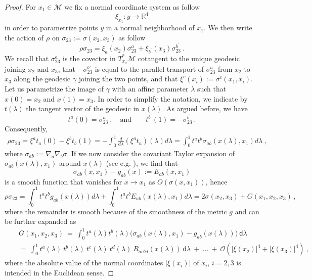 \documentclass[11pt]{book}
\newcommand{\abs}[1]{\left|#1\right|}
\newcommand{\Mcal}{\mathcal{M}}
\newcommand{\Ocal}{\mathcal{O}}
\newcommand{\Rbb}{\mathbb{R}}
\newcommand{\dsf}{\mathsf{d}}
\theoremstyle{break}
\begin{document}
\begin{proof}
For $x_1 \in \Mcal$ we fix a normal coordinate system as follow
%
\begin{equation*}
\xi_{x_1} : y \to \Rbb^4 
\end{equation*}
%
in order to parametrize points $y$ in a normal neighborhood of $x_1$. We then write the action of $\rho$ on $\sigma_{23}:=\sigma(x_2,x_3)$ as follow
%
\begin{equation*}
\rho \sigma_{23} = \xi_a(x_2) \sigma^a_{23} + \xi_{b^\prime}(x_3)\sigma^{b^\prime}_{23} \ . 
\end{equation*}
%
We recall that $\sigma_{23}^a$ is the covector in $T^*_{x_2}\Mcal$ cotangent to the unique geodesic joining $x_2$ and $x_3$, that $-\sigma^{b'}_{23}$ is equal to the parallel transport of $\sigma^a_{23}$ from $x_2$ to $x_3$ along the geodesic $\gamma$ joining the two points, and that $\xi^c(x_i):=\sigma^c(x_1,x_i)$.
%
Let us parametrize the image of $\gamma$ with an affine parameter $\lambda$ such that $x(0) = x_2$ and $x(1) = x_3$. In order to simplify the notation, we indicate by $t(\lambda)$ the tangent vector of the geodesic in $x(\lambda)$. As argued before, we have
%
\begin{equation*}
t^a(0)=\sigma^a_{23}\ , \quad \mbox{and} \qquad t^{b^\prime}(1)=-\sigma^{b^\prime}_{23} \ . 
\end{equation*}
%
Consequently,
%
\begin{eqnarray*}
\rho \sigma_{23} = \xi^a t_a (0) - \xi^b t_b(1) = - \int_{0}^{1} \frac{d}{d\lambda} (\xi^a t_a)(\lambda) d\lambda = \int_{0}^{1} t^a t^b \sigma_{ab}(x(\lambda),x_1) d\lambda \ ,
\end{eqnarray*}
where $\sigma_{ab} := \nabla_a\nabla_b \sigma$. If we now consider the covariant Taylor expansion of $\sigma_{ab}(x(\lambda),x_1)$ around $x(\lambda)$ (see e.g. \cite{poisson_motion_2011}), we find that 
%
\begin{equation*}
\sigma_{ab}(x,x_1) - g_{ab}(x) := E_{ab}(x,x_1)
\end{equation*}
%
is a smooth function that vanishes for $x\to x_1$ as $O(\sigma(x,x_1))$, hence
%
\begin{equation*}
\rho\sigma_{23}  = \int_{0}^{1} t^a t^b g_{ab}(x(\lambda))    d\lambda +  \int_{0}^{1} t^a t^b E_{ab}(x(\lambda),x_1)    d\lambda  = 2\sigma(x_2,x_3) + G(x_1,x_2,x_3)\,,
\end{equation*}
%
where the remainder is smooth because of the smoothness of the metric $g$ and can be further expanded as 
%
\begin{eqnarray}
&& G(x_1,x_2,x_3) \ = \ 
\int_{0}^{1} t^a(\lambda) t^b(\lambda) \bigg( \sigma_{ab}\left(x(\lambda),x_1\right) - g_{ab}\left(x(\lambda)\right) \bigg) \ \dsf\lambda
\label{eq:remainder_sigma}
\\ 
&& = \ \int_{0}^{1} t^a(\lambda) \ t^b(\lambda) \ t^c(\lambda) \ t^d(\lambda) \ R_{acbd}\left(x(\lambda)\right) \ \dsf\lambda \ + \ \dots \ + \ \Ocal\left(\abs{\xi(x_2)}^4 + \abs{\xi(x_3)}^4\right) \ , \nonumber
\end{eqnarray}
where the absolute value of the normal coordinates $|\xi(x_i)|$ of $x_i$, $i=2,3$ is intended in the Euclidean sense.
\end{proof}
\end{document}
